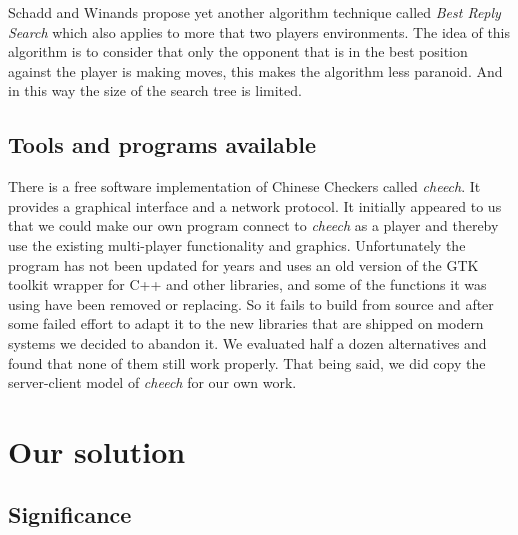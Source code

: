 \documentclass[a4paper,11pt]{article}
\begin{document}
Schadd and Winands propose yet another algorithm technique called \textit{
Best Reply Search} \cite{bestreplysearch} which also applies to more that
two players environments. The idea of this algorithm is to consider that
only the opponent that is in the best position against the player is making
moves, this makes the algorithm less paranoid. And in this way the size of
the search tree is limited.


\subsection{Tools and programs available}
There is a free software implementation of Chinese Checkers called
\emph{cheech}. It provides a graphical interface and a network
protocol. It initially appeared to us that we could make our own
program connect to \emph{cheech} as a player and thereby use the
existing multi-player functionality and graphics. Unfortunately the program has
not been updated for years and uses an old version of the GTK toolkit wrapper
for C++ and other libraries, and some of the functions it was using have been
removed or replacing. So it fails to build from source and after some failed
effort to adapt it to the new libraries that are shipped on modern systems we
decided to abandon it.
We evaluated half a dozen alternatives and found that none of them
still work properly. That being said, we did copy the server-client
model of \emph{cheech} for our own work.

\section{Our solution}
\subsection{Significance}
\end{document}
